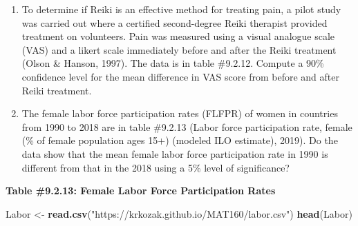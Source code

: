 \documentclass[
]{book}
\newenvironment{Shaded}{\begin{snugshade}}{\end{snugshade}}
\newcommand{\KeywordTok}[1]{\textcolor[rgb]{0.13,0.29,0.53}{\textbf{#1}}}
\newcommand{\NormalTok}[1]{#1}
\newcommand{\StringTok}[1]{\textcolor[rgb]{0.31,0.60,0.02}{#1}}
\begin{document}
\begin{enumerate}
\def\labelenumi{\arabic{enumi}.}
\setcounter{enumi}{7}
\item
  To determine if Reiki is an effective method for treating pain, a pilot study was carried out where a certified second-degree Reiki therapist provided treatment on volunteers. Pain was measured using a visual analogue scale (VAS) and a likert scale immediately before and after the Reiki treatment (Olson \& Hanson, 1997). The data is in table \#9.2.12. Compute a 90\% confidence level for the mean difference in VAS score from before and after Reiki treatment.
\item
  The female labor force participation rates (FLFPR) of women in countries from 1990 to 2018 are in table \#9.2.13 (Labor force participation rate, female (\% of female population ages 15+) (modeled ILO estimate), 2019). Do the data show that the mean female labor force participation rate in 1990 is different from that in the 2018 using a 5\% level of significance?
\end{enumerate}

\textbf{Table \#9.2.13: Female Labor Force Participation Rates}

\begin{Shaded}
\begin{Highlighting}[]
\NormalTok{Labor <-}\StringTok{ }\KeywordTok{read.csv}\NormalTok{(}\StringTok{"https://krkozak.github.io/MAT160/labor.csv"}\NormalTok{)}
\KeywordTok{head}\NormalTok{(Labor)}
\end{Highlighting}
\end{Shaded}
\end{document}
